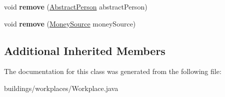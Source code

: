 \begin{DoxyCompactItemize}
\item 
void {\bfseries remove} (\hyperlink{classpeople_1_1_abstract_person}{Abstract\+Person} abstract\+Person)\hypertarget{classbuildings_1_1workplaces_1_1_workplace_ae2af64e5c0a04d3226d884a759c09661}{}\label{classbuildings_1_1workplaces_1_1_workplace_ae2af64e5c0a04d3226d884a759c09661}

\item 
void {\bfseries remove} (\hyperlink{classuniverse_1_1_money_source}{Money\+Source} money\+Source)\hypertarget{classbuildings_1_1workplaces_1_1_workplace_a11ba62b2995baa093e5a86c25e2af07e}{}\label{classbuildings_1_1workplaces_1_1_workplace_a11ba62b2995baa093e5a86c25e2af07e}

\end{DoxyCompactItemize}
\subsection*{Additional Inherited Members}


The documentation for this class was generated from the following file\+:\begin{DoxyCompactItemize}
\item 
buildings/workplaces/Workplace.\+java\end{DoxyCompactItemize}
